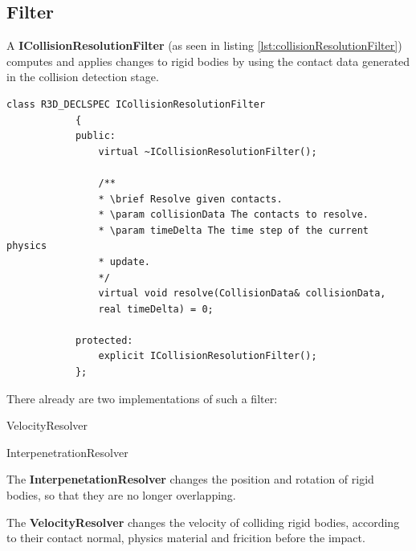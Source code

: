 \documentclass[12p, paper=a4, leqno, colorinlistoftodos]{article}
\newenvironment{packed_itemize}
{\begin{itemize}
		\setlength{\itemsep}{0pt}
		\setlength{\parskip}{0pt}
		\setlength{\parsep}{0pt}
	}{\end{itemize}}
\begin{document}
		\subsection{Filter}
		A \textbf{ICollisionResolutionFilter} (as seen in listing \ref{lst:collisionResolutionFilter}) computes and applies changes to rigid bodies by using the contact data generated in the collision detection stage. 
		\begin{lstlisting}[caption={Collision resolution filter},captionpos=b, label=lst:collisionResolutionFilter]
			class R3D_DECLSPEC ICollisionResolutionFilter
			{
			public:
				virtual ~ICollisionResolutionFilter();
				
				/**
				* \brief Resolve given contacts.
				* \param collisionData The contacts to resolve.
				* \param timeDelta The time step of the current physics
				* update.
				*/
				virtual void resolve(CollisionData& collisionData,
				real timeDelta) = 0;
				
			protected:
				explicit ICollisionResolutionFilter();
			};
		\end{lstlisting}
		There already are two implementations of such a filter:
		\begin{packed_itemize}
			\item VelocityResolver
			\item InterpenetrationResolver
		\end{packed_itemize}
		The \textbf{InterpenetationResolver} changes the position and rotation of rigid bodies, so that they are no longer overlapping.
		
		The \textbf{VelocityResolver} changes the velocity of colliding rigid bodies, according to their contact normal, physics material and fricition before the impact.
		
		
		
	
	
	
	
	
	
	
	
\end{document}

